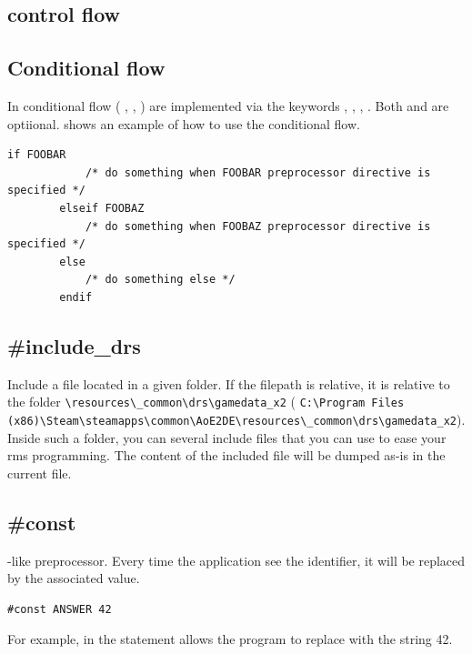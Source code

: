 \begin{appendices}
    \section{ control flow}

    \subsection{Conditional flow}

    In  conditional flow (\ie{} , , ) are implemented via the keywords , , , . Both  and  are optiional.
     shows an example of how to use the conditional flow.

    \begin{lstlisting}[language={rms}, label={lst:if}]
        if FOOBAR
            /* do something when FOOBAR preprocessor directive is specified */
        elseif FOOBAZ
            /* do something when FOOBAZ preprocessor directive is specified */
        else
            /* do something else */
        endif
    \end{lstlisting}

    \subsection{\#include\_drs}

    Include a file located in a given folder. If the filepath is relative, it is relative to the folder \aoeexedir{}\verb|\resources\_common\drs\gamedata_x2| (\eg{} \verb|C:\Program Files (x86)\Steam\steamapps\common\AoE2DE\resources\_common\drs\gamedata_x2|). Inside such a folder, you can several include files that you can use to ease your rms programming. The content of the included file will be dumped as-is in the current file.

    \subsection{\#const}

    -like preprocessor. Every time the application see the identifier, it will be replaced by the associated value.

    \begin{lstlisting}[language={rms}, label={lst:const}]
        #const ANSWER 42
    \end{lstlisting}

    For example, in  the statement allows the program to replace  with the string 42.


\end{appendices}
